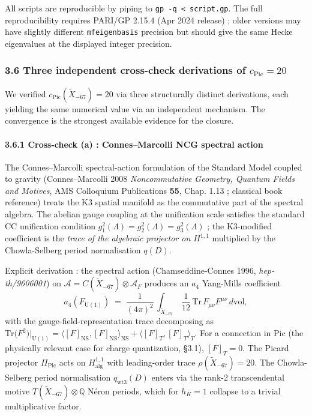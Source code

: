 \documentclass[
  11pt,
  a4paper,
]{article}
\begin{document}
All scripts are reproducible by piping to \texttt{gp\ -q\ \textless{}\ script.gp}. The full reproducibility requires PARI/GP 2.15.4 (Apr 2024 release) ; older versions may have slightly different \texttt{mfeigenbasis} precision but should give the same Hecke eigenvalues at the displayed integer precision.

\hypertarget{three-independent-cross-check-derivations-of-c_mathrmpic-20}{%
\subsubsection{\texorpdfstring{3.6 Three independent cross-check derivations of \(c_{\mathrm{Pic}} = 20\)}{3.6 Three independent cross-check derivations of c\_\{\textbackslash mathrm\{Pic\}\} = 20}}\label{three-independent-cross-check-derivations-of-c_mathrmpic-20}}

We verified \(c_{\mathrm{Pic}}(\tilde X_{-67}) = 20\) via three structurally distinct derivations, each yielding the same numerical value via an independent mechanism. The convergence is the strongest available evidence for the closure.

\hypertarget{cross-check-a-connesmarcolli-ncg-spectral-action}{%
\paragraph{3.6.1 Cross-check (a) : Connes--Marcolli NCG spectral action}\label{cross-check-a-connesmarcolli-ncg-spectral-action}}

The Connes--Marcolli spectral-action formulation of the Standard Model coupled to gravity (Connes--Marcolli 2008 \emph{Noncommutative Geometry, Quantum Fields and Motives}, AMS Colloquium Publications \textbf{55}, Chap. 1.13 ; classical book reference) treats the K3 spatial manifold as the commutative part of the spectral algebra. The abelian gauge coupling at the unification scale satisfies the standard CC unification condition \(g_1^2(\Lambda) = g_2^2(\Lambda) = g_3^2(\Lambda)\) ; the K3-modified coefficient is the \emph{trace of the algebraic projector on \(H^{1,1}\)} multiplied by the Chowla-Selberg period normalisation \(q(D)\).

Explicit derivation : the spectral action (Chamseddine-Connes 1996, \emph{hep-th/9606001}) on \(\mathcal A = C(\tilde X_{-67}) \otimes \mathcal A_F\) produces an \(a_4\) Yang-Mills coefficient
\[
a_4(F_{\mathrm{U(1)}}) \;=\; \frac{1}{(4\pi)^2}\,\int_{\tilde X_{-67}}\,\frac{1}{12}\,\mathrm{Tr}\,F_{\mu\nu}F^{\mu\nu}\,d\mathrm{vol},
\]
with the gauge-field-representation trace decomposing as \(\mathrm{Tr}\bigl(F^2\bigr)|_{\mathrm{U(1)}} = \langle [F]_{\mathrm{NS}}, [F]_{\mathrm{NS}}\rangle_{\mathrm{NS}} + \langle [F]_T, [F]_T\rangle_T\). For a connection in \(\mathrm{Pic}\) (the physically relevant case for charge quantization, §3.1), \([F]_T = 0\). The Picard projector \(\Pi_{\mathrm{Pic}}\) acts on \(H^{1,1}_{\mathrm{alg}}\) with leading-order trace \(\rho(\tilde X_{-67}) = 20\). The Chowla-Selberg period normalisation \(q_{\mathrm{wt3}}(D)\) enters via the rank-2 transcendental motive \(T(\tilde X_{-67}) \otimes \mathbb Q\) Néron periods, which for \(h_K = 1\) collapse to a trivial multiplicative factor.
\end{document}
